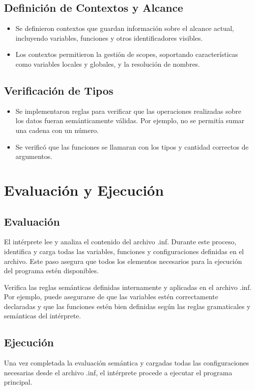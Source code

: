 \subsection{Definición de Contextos y Alcance}
\begin{itemize}
  \item Se definieron contextos que guardan información sobre el alcance actual, incluyendo variables, funciones y otros identificadores visibles.
  \item Los contextos permitieron la gestión de scopes, soportando características como variables locales y globales, y la resolución de nombres.
\end{itemize}

\subsection{Verificación de Tipos}
\begin{itemize}
  \item Se implementaron reglas para verificar que las operaciones realizadas sobre los datos fueran semánticamente válidas. Por ejemplo, no se permitía sumar una cadena con un número.
  \item Se verificó que las funciones se llamaran con los tipos y cantidad correctos de argumentos.
\end{itemize}

\section{Evaluación y Ejecución}
\subsection{Evaluación}
El intérprete lee y analiza el contenido del archivo .inf. Durante este proceso, identifica y carga todas las variables, funciones y configuraciones definidas en el archivo. Este paso asegura que todos los elementos necesarios para la ejecución del programa estén disponibles.

Verifica las reglas semánticas definidas internamente y aplicadas en el archivo .inf. Por ejemplo, puede asegurarse de que las variables estén correctamente declaradas y que las funciones estén bien definidas según las reglas gramaticales y semánticas del intérprete.

\subsection{Ejecución}
Una vez completada la evaluación semántica y cargadas todas las configuraciones necesarias desde el archivo .inf, el intérprete procede a ejecutar el programa principal.

